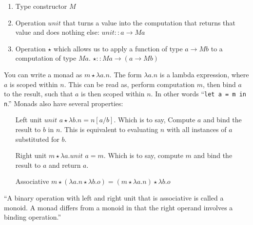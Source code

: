 \begin{enumerate}
    \item Type constructor $M$
    \item Operation $\mathit{unit}$ that turns a value into the computation that
    returns that value and does nothing else:
    \( \mathit{unit} :: a \rightarrow M a \)
    \item Operation $\star$ which allows us to apply a function of type
    $a \rightarrow M b$ to a computation of type $M a$.
    \( \star :: M a \rightarrow (a \rightarrow M b)\)
\end{enumerate}

You can write a monad as $m \star \lambda a . n$. The form $\lambda a . n$ is a
lambda expression, where $a$ is scoped within $n$. This can be read as, perform
computation $m$, then bind $a$ to the result, such that $a$ is then scoped
within $n$. In other words ``\lstinline|let a = m in n|.'' Monads also have
several properties:

\begin{enumerate}
    \item[Left unit] $\textit{unit } a \star \lambda b . n = n[a/b]$. Which is
    to say, Compute $a$ and bind the result to $b$ in $n$. This is equivalent to
    evaluating $n$ with all instances of $a$ substituted for $b$.
    \item[Right unit] $m \star \lambda a . \textit{unit } a = m$. Which is to
    say, compute $m$ and bind the result to $a$ and return $a$.
    \item[Associative] $m \star (\lambda a . n \star \lambda b . o) =
    (m \star \lambda a . n) \star \lambda b . o$
\end{enumerate}

``A binary operation with left and right unit that is associative is called a
monoid. A monad differs from a monoid in that the right operand involves a
binding operation.''